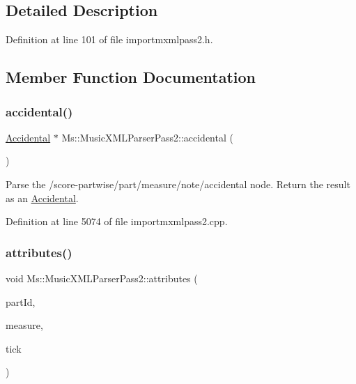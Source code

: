 \subsection{Detailed Description}


Definition at line 101 of file importmxmlpass2.\+h.



\subsection{Member Function Documentation}
\mbox{\label{class_ms_1_1_music_x_m_l_parser_pass2_a6cecdfbcb5105fedfbe981ea022df7a8}} 
\subsubsection{\texorpdfstring{accidental()}{accidental()}}
{\footnotesize\ttfamily \hyperlink{class_ms_1_1_accidental}{Accidental} $\ast$ Ms\+::\+Music\+X\+M\+L\+Parser\+Pass2\+::accidental (\begin{DoxyParamCaption}{ }\end{DoxyParamCaption})}

Parse the /score-\/partwise/part/measure/note/accidental node. Return the result as an \hyperlink{class_ms_1_1_accidental}{Accidental}. 

Definition at line 5074 of file importmxmlpass2.\+cpp.

\mbox{\label{class_ms_1_1_music_x_m_l_parser_pass2_adac6c4f2cd310507980dd7d57aa3c8e7}} 
\subsubsection{\texorpdfstring{attributes()}{attributes()}}
{\footnotesize\ttfamily void Ms\+::\+Music\+X\+M\+L\+Parser\+Pass2\+::attributes (\begin{DoxyParamCaption}\item[{const Q\+String \&}]{part\+Id,  }\item[{\hyperlink{class_ms_1_1_measure}{Measure} $\ast$}]{measure,  }\item[{const int}]{tick }\end{DoxyParamCaption})}

